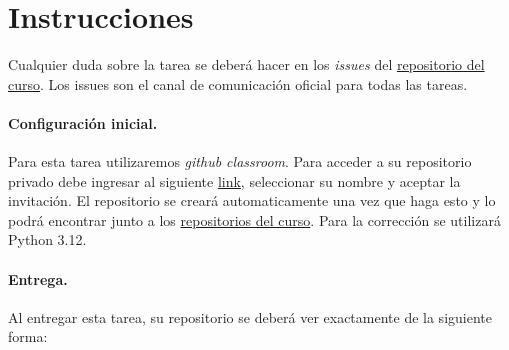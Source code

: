 
\section*{Instrucciones}

Cualquier duda sobre la tarea se deberá hacer en los \emph{issues} del \href{https://github.com/IIC3253/2025}{repositorio del curso}. Los issues son el canal de comunicación oficial para todas las tareas.

\paragraph{Configuración inicial.} 
Para esta tarea utilizaremos \textit{github classroom}. 
Para acceder a su repositorio privado debe ingresar al siguiente \href{https://classroom.github.com/a/64_0J7c4}{link}, seleccionar su nombre y aceptar la invitación.
El repositorio se creará automaticamente una vez que haga esto y lo podrá encontrar junto a los \href{https://github.com/orgs/IIC3253/repositories}{repositorios del curso}.
Para la corrección se utilizará Python 3.12.

\paragraph{Entrega.} Al entregar esta tarea, su repositorio se deberá ver exactamente de la siguiente forma:

\bigskip



